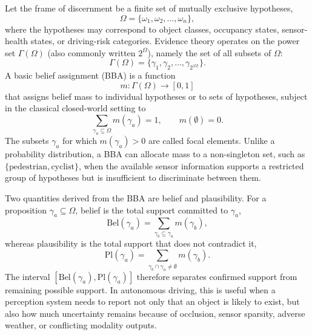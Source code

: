 \documentclass[graybox,envcountchap]{style/SNmono}
\begin{document}
Let the frame of discernment be a finite set of mutually exclusive hypotheses,
\begin{equation}
\Omega = \{\omega_1, \omega_2, \ldots, \omega_n\},
\end{equation}
where the hypotheses may correspond to object classes, occupancy states, sensor-health states, or driving-risk categories. Evidence theory operates on the power set \(\Gamma(\Omega)\) (also commonly written $2^{\Omega}$), namely the set of all subsets of \(\Omega\):
\begin{equation}
\Gamma(\Omega) = \{\gamma_1, \gamma_2, \ldots, \gamma_{2^{|\Omega|}}\}.
\end{equation}
A basic belief assignment (BBA) is a function
\begin{equation}
m: \Gamma(\Omega) \rightarrow [0,1]
\end{equation}
that assigns belief mass to individual hypotheses or to sets of hypotheses, subject in the classical closed-world setting to
\begin{equation}
\sum_{\gamma_a \subseteq \Omega} m(\gamma_a)=1, \qquad m(\emptyset)=0.
\label{eq:bba}
\end{equation}
The subsets \(\gamma_a\) for which \(m(\gamma_a)>0\) are called focal elements. Unlike a probability distribution, a BBA can allocate mass to a non-singleton set, such as \(\{\text{pedestrian},\text{cyclist}\}\), when the available sensor information supports a restricted group of hypotheses but is insufficient to discriminate between them.

Two quantities derived from the BBA are belief and plausibility. For a proposition \(\gamma_a \subseteq \Omega\), belief is the total support committed to \(\gamma_a\),
\begin{equation}
\mathrm{Bel}(\gamma_a)=
\sum_{\gamma_b\subseteq \gamma_a}m(\gamma_b),
\end{equation}
whereas plausibility is the total support that does not contradict it,
\begin{equation}
\mathrm{Pl}(\gamma_a)=
\sum_{\gamma_b\cap \gamma_a\neq \emptyset}m(\gamma_b).
\end{equation}
The interval \([\mathrm{Bel}(\gamma_a),\mathrm{Pl}(\gamma_a)]\) therefore separates confirmed support from remaining possible support. In autonomous driving, this is useful when a perception system needs to report not only that an object is likely to exist, but also how much uncertainty remains because of occlusion, sensor sparsity, adverse weather, or conflicting modality outputs.
\end{document}
